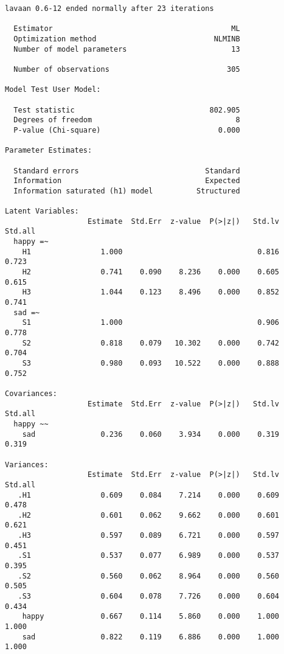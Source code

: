 \documentclass[
  letterpaper,
  DIV=11,
  numbers=noendperiod]{scrreprt}
\begin{document}
\begin{verbatim}
lavaan 0.6-12 ended normally after 23 iterations

  Estimator                                         ML
  Optimization method                           NLMINB
  Number of model parameters                        13

  Number of observations                           305

Model Test User Model:
                                                      
  Test statistic                               802.905
  Degrees of freedom                                 8
  P-value (Chi-square)                           0.000

Parameter Estimates:

  Standard errors                             Standard
  Information                                 Expected
  Information saturated (h1) model          Structured

Latent Variables:
                   Estimate  Std.Err  z-value  P(>|z|)   Std.lv  Std.all
  happy =~                                                              
    H1                1.000                               0.816    0.723
    H2                0.741    0.090    8.236    0.000    0.605    0.615
    H3                1.044    0.123    8.496    0.000    0.852    0.741
  sad =~                                                                
    S1                1.000                               0.906    0.778
    S2                0.818    0.079   10.302    0.000    0.742    0.704
    S3                0.980    0.093   10.522    0.000    0.888    0.752

Covariances:
                   Estimate  Std.Err  z-value  P(>|z|)   Std.lv  Std.all
  happy ~~                                                              
    sad               0.236    0.060    3.934    0.000    0.319    0.319

Variances:
                   Estimate  Std.Err  z-value  P(>|z|)   Std.lv  Std.all
   .H1                0.609    0.084    7.214    0.000    0.609    0.478
   .H2                0.601    0.062    9.662    0.000    0.601    0.621
   .H3                0.597    0.089    6.721    0.000    0.597    0.451
   .S1                0.537    0.077    6.989    0.000    0.537    0.395
   .S2                0.560    0.062    8.964    0.000    0.560    0.505
   .S3                0.604    0.078    7.726    0.000    0.604    0.434
    happy             0.667    0.114    5.860    0.000    1.000    1.000
    sad               0.822    0.119    6.886    0.000    1.000    1.000
\end{verbatim}
\end{document}
